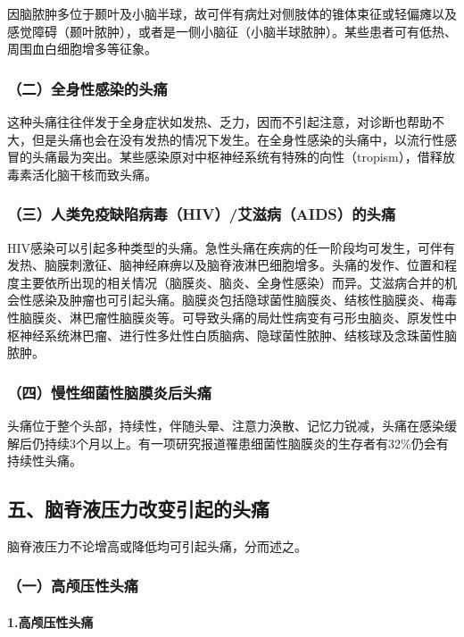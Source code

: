 因脑脓肿多位于颞叶及小脑半球，故可伴有病灶对侧肢体的锥体束征或轻偏瘫以及感觉障碍（颞叶脓肿），或者是一侧小脑征（小脑半球脓肿）。某些患者可有低热、周围血白细胞增多等征象。

\subsubsection{（二）全身性感染的头痛}

这种头痛往往伴发于全身症状如发热、乏力，因而不引起注意，对诊断也帮助不大，但是头痛也会在没有发热的情况下发生。在全身性感染的头痛中，以流行性感冒的头痛最为突出。某些感染原对中枢神经系统有特殊的向性（tropism），借释放毒素活化脑干核而致头痛。

\subsubsection{（三）人类免疫缺陷病毒（HIV）/艾滋病（AIDS）的头痛}

HIV感染可以引起多种类型的头痛。急性头痛在疾病的任一阶段均可发生，可伴有发热、脑膜刺激征、脑神经麻痹以及脑脊液淋巴细胞增多。头痛的发作、位置和程度主要依所出现的相关情况（脑膜炎、脑炎、全身性感染）而异。艾滋病合并的机会性感染及肿瘤也可引起头痛。脑膜炎包括隐球菌性脑膜炎、结核性脑膜炎、梅毒性脑膜炎、淋巴瘤性脑膜炎等。可导致头痛的局灶性病变有弓形虫脑炎、原发性中枢神经系统淋巴瘤、进行性多灶性白质脑病、隐球菌性脓肿、结核球及念珠菌性脑脓肿。

\subsubsection{（四）慢性细菌性脑膜炎后头痛}

头痛位于整个头部，持续性，伴随头晕、注意力涣散、记忆力锐减，头痛在感染缓解后仍持续3个月以上。有一项研究报道罹患细菌性脑膜炎的生存者有32\%仍会有持续性头痛。

\subsection{五、脑脊液压力改变引起的头痛}

脑脊液压力不论增高或降低均可引起头痛，分而述之。

\subsubsection{（一）高颅压性头痛}

\paragraph{1.高颅压性头痛}

